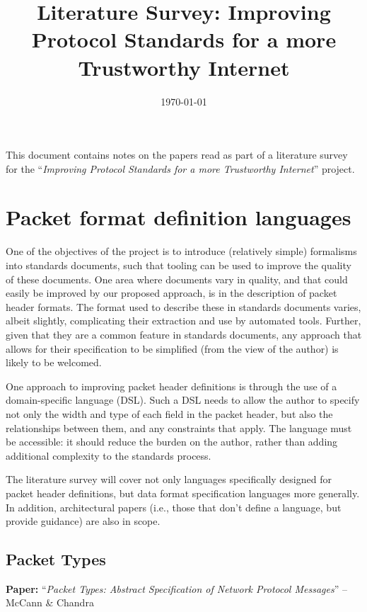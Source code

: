 \documentclass[10pt]{article}
\title{Literature Survey: Improving Protocol Standards for a more Trustworthy Internet}
\date{\today}
\newcommand{\paper}[3]{\vspace{4mm}\noindent\textbf{Paper:} ``\textit{#1}'' -- #2 \cite{#3}\vspace{3mm}}
\begin{document}
\maketitle

This document contains notes on the papers read as part of a literature survey for the
``\textit{Improving Protocol Standards for a more Trustworthy Internet}'' project.

\section{Packet format definition languages}

One of the objectives of the project is to introduce (relatively simple) formalisms into
standards documents, such that tooling can be used to improve the quality of these
documents. One area where documents vary in quality, and that could easily be
improved by our proposed approach, is in the description of packet header formats. The
format used to describe these in standards documents varies, albeit slightly, complicating
their extraction and use by automated tools. Further, given that they are a common feature
in standards documents, any approach that allows for their specification to be simplified
(from the view of the author) is likely to be welcomed.

One approach to improving packet header definitions is through the use of a
domain-specific language (DSL). Such a DSL needs to allow the author to specify not only
the width and type of each field in the packet header, but also the relationships between
them, and any constraints that apply. The language must be accessible: it should reduce
the burden on the author, rather than adding additional complexity to the standards 
process.

The literature survey will cover not only languages specifically designed for packet
header definitions, but data format specification languages more generally. In addition,
architectural papers (i.e., those that don't define a language, but provide guidance) are
also in scope.

\subsection{Packet Types}

\paper{Packet Types: Abstract Specification of Network Protocol Messages}{McCann \& Chandra}{mccann2000packet}
\end{document}
